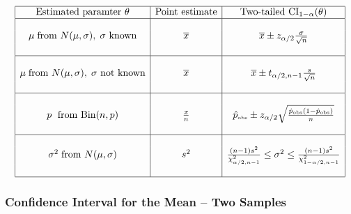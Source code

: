 \documentclass{article}
\newcommand{\Tr}[2]{#1}
\def\obs{{\mbox{\tiny obs}}}
\def\CI{\mbox{CI}}
\newcommand\conj[1]{{\overline #1}}
\let\ob\conj
\begin{document}
\begin{eqnarray*}\begin{array}{|c|c|c|}\hline
     \mbox{\Tr{Estimated paramter $\theta$}{Parameter $\theta$ som skattas}}
   & \mbox{\Tr{Point estimate}{Punktskattning}}
   & \mbox{\Tr{Two-tailed}{Tvåsidigt konfidensintervall} }
   \CI_{1-\alpha}(\theta) \\

\hline && \\
\mu \;\mbox{\Tr{from}{från} } N(\mu,\sigma),\; \sigma \mbox{ \Tr{known}{känd}}
 & \overline{x}
 &  \ob x \pm \Tr{z}{\lambda}_{\alpha/2}\frac{\sigma}{\sqrt{n}}\\&&\\

\hline &&\\
\mu \;\mbox{\Tr{from}{från} } N(\mu,\sigma),\; \sigma \mbox{ \Tr{not known}{ej känd}}
 & \overline{x}
& \ob x \pm t_{\alpha/2,n-1}\frac{s}{\sqrt{n}}\\&&\\

\hline &&\\p \;\mbox{ \Tr{from}{från} Bin}(n,p) & \frac xn
& \hat p_\obs\pm
\Tr{z}{\lambda}_{\alpha/2}\sqrt{\frac{\hat p_\obs(1-\hat p_\obs)}{n}}

\\&&\\

\hline &&\\
\sigma^2 \;\mbox{\Tr{from}{från} } N(\mu,\sigma)
 & s^2&\frac{(n-1)s^2}{\chi^2_{\alpha/2,n-1}}
  \leq\sigma^2
  \leq \frac{(n-1)s^2}{\chi^2_{1-\alpha/2,n-1}}

 \\&&\\
\hline

  \end{array}
\end{eqnarray*}

\subsubsection*{\Tr{Confidence Interval for the Mean -- Two Samples}%
                   {Konfidensintervall -- två normalfördelade stickprov}}
\end{document}
